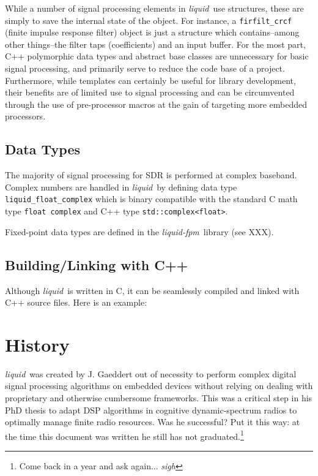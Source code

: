 \documentclass[11pt,twoside]{report}
\newcommand{\liquid}{{\it liquid}}
\newcommand{\liquidfpm}{{\it liquid-fpm}}
\begin{document}
While a number of signal processing elements in \liquid\ use structures, these
are simply to save the internal state of the object.
For instance, a {\tt firfilt\_crcf} (finite impulse response filter) object
is just a structure which contains--among other things--the filter taps
(coefficients) and an input buffer.
For the most part, C++ polymorphic data types and abstract base classes are
unnecessary for basic signal processing, and primarily serve to reduce the
code base of a project.
Furthermore, while templates can certainly be useful for library development,
their benefits are of limited use to signal processing and can be circumvented
through the use of pre-processor macros at the gain of targeting more embedded
processors.

\subsection{Data Types}
The majority of signal processing for SDR is performed at complex baseband.
Complex numbers are handled in \liquid\ by defining data type
{\tt liquid\_float\_complex} which is binary compatible with the standard
C math type {\tt float complex} and C++ type {\tt std::complex<float>}.

Fixed-point data types are defined in the \liquidfpm\ library (see XXX).

\subsection{Building/Linking with C++}
Although \liquid\ is written in C, it can be seamlessly compiled and linked
with C++ source files.
Here is an example:


\section{History}
\liquid\ was created by J. Gaeddert out of necessity to perform complex
digital signal processing algorithms on embedded devices
without relying on dealing
with proprietary and otherwise cumbersome frameworks.
This was a critical step in his PhD thesis to adapt DSP algorithms in
cognitive dynamic-spectrum radios to optimally manage finite radio resources.
Was he successful?
Put it this way: at the time this document was written he still has not
graduated.\footnote{Come back in a year and ask again... {\em sigh}}

%
%
\end{document}

